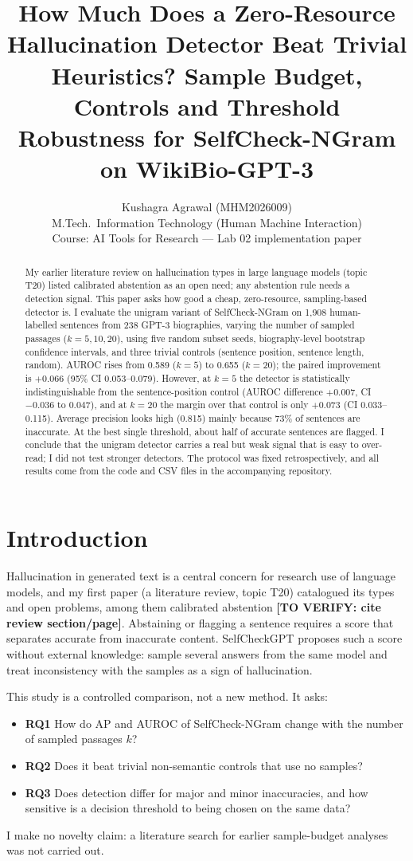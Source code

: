 \documentclass[10pt,twocolumn]{article}
\title{How Much Does a Zero-Resource Hallucination Detector Beat Trivial Heuristics? Sample Budget, Controls and Threshold Robustness for SelfCheck-NGram on WikiBio-GPT-3}
\author{Kushagra Agrawal (MHM2026009)\\ M.Tech.\ Information Technology (Human Machine Interaction)\\ Course: AI Tools for Research --- Lab 02 implementation paper}
\date{}
\newcommand{\todo}[1]{\textbf{[#1]}}
\begin{document}
\maketitle

\begin{abstract}
My earlier literature review on hallucination types in large language models (topic T20) listed calibrated abstention as an open need; any abstention rule needs a detection signal. This paper asks how good a cheap, zero-resource, sampling-based detector is. I evaluate the unigram variant of SelfCheck-NGram on 1,908 human-labelled sentences from 238 GPT-3 biographies, varying the number of sampled passages ($k=5,10,20$), using five random subset seeds, biography-level bootstrap confidence intervals, and three trivial controls (sentence position, sentence length, random). AUROC rises from 0.589 ($k=5$) to 0.655 ($k=20$); the paired improvement is $+0.066$ (95\% CI 0.053--0.079). However, at $k=5$ the detector is statistically indistinguishable from the sentence-position control (AUROC difference $+0.007$, CI $-0.036$ to $0.047$), and at $k=20$ the margin over that control is only $+0.073$ (CI 0.033--0.115). Average precision looks high (0.815) mainly because 73\% of sentences are inaccurate. At the best single threshold, about half of accurate sentences are flagged. I conclude that the unigram detector carries a real but weak signal that is easy to over-read; I did not test stronger detectors. The protocol was fixed retrospectively, and all results come from the code and CSV files in the accompanying repository.
\end{abstract}

\section{Introduction}
Hallucination in generated text is a central concern for research use of language models, and my first paper (a literature review, topic T20) catalogued its types and open problems, among them calibrated abstention \todo{TO VERIFY: cite review section/page}. Abstaining or flagging a sentence requires a score that separates accurate from inaccurate content. SelfCheckGPT \cite{manakul2023selfcheckgpt} proposes such a score without external knowledge: sample several answers from the same model and treat inconsistency with the samples as a sign of hallucination.

This study is a controlled comparison, not a new method. It asks:
\begin{itemize}\setlength\itemsep{0pt}
\item \textbf{RQ1} How do AP and AUROC of SelfCheck-NGram change with the number of sampled passages $k$?
\item \textbf{RQ2} Does it beat trivial non-semantic controls that use no samples?
\item \textbf{RQ3} Does detection differ for major and minor inaccuracies, and how sensitive is a decision threshold to being chosen on the same data?
\end{itemize}
I make no novelty claim: a literature search for earlier sample-budget analyses was not carried out.
\end{document}
